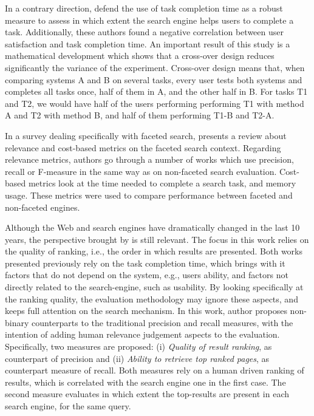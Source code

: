 In a contrary direction,  defend the use of task completion time as a robust measure to assess in which extent the search engine helps users to complete a task.
Additionally, these authors found a negative correlation between user satisfaction and task completion time.
An important result of this study is a mathematical development which shows that a cross-over design reduces significantly the variance of the experiment.
Cross-over design means that, when comparing systems A and B on several tasks, every user tests both systems and completes all tasks once, half of them in A, and the other half in B.
For tasks T1 and T2, we would have half of the users performing performing T1 with method A and T2 with method B, and half of them performing T1-B and T2-A.


In a survey dealing specifically with faceted search,  presents a review about relevance and cost-based metrics on the faceted search context.
Regarding relevance metrics, authors go through a number of works which use precision, recall or F-measure in the same way as on non-faceted search evaluation.
Cost-based metrics look at the time needed to complete a search task, and memory usage.
These metrics were used to compare performance between faceted and non-faceted engines.

Although the Web and search engines have dramatically changed in the last 10 years, the perspective brought by  is still relevant.
The focus in this work relies on the quality of ranking, i.e., the order in which results are presented.
Both works presented previously rely on the task completion time, which brings with it factors that do not depend on the system, e.g., users ability, and factors not directly related to the search-engine, such as usability.
By looking specifically at the ranking quality, the evaluation methodology may ignore these aspects, and keeps full attention on the search mechanism.
In this work, author proposes non-binary counterparts to the traditional precision and recall measures, with the intention of adding human relevance judgement aspects to the evaluation.
Specifically, two measures are proposed: (i) \emph{Quality of result ranking}, as counterpart of precision and (ii) \emph{Ability to retrieve top ranked pages}, as counterpart measure of recall.
Both measures rely on a human driven ranking of results, which is correlated with the search engine one in the first case.
The second measure evaluates in which extent the top-results are present in each search engine, for the same query.

